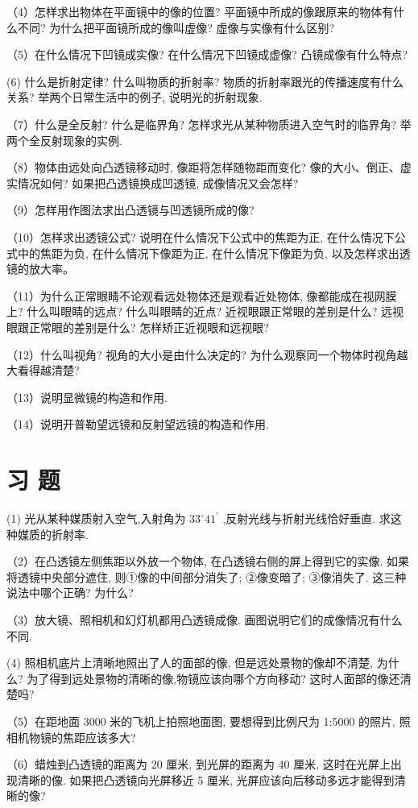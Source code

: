\documentclass[10pt]{article}
\begin{document}
（4）怎样求出物体在平面镜中的像的位置? 平面镜中所成的像跟原来的物体有什么不同? 为什么把平面镜所成的像叫虚像? 虚像与实像有什么区别?

（5）在什么情况下凹镜成实像? 在什么情况下凹镜成虚像? 凸镜成像有什么特点?

(6) 什么是折射定律? 什么叫物质的折射率? 物质的折射率跟光的传播速度有什么关系? 举两个日常生活中的例子, 说明光的折射现象.

（7）什么是全反射? 什么是临界角? 怎样求光从某种物质进入空气时的临界角? 举两个全反射现象的实例.

（8）物体由远处向凸透镜移动时, 像距将怎样随物距而变化? 像的大小、倒正、虚实情况如何? 如果把凸透镜换成凹透镜, 成像情况又会怎样?

（9）怎样用作图法求出凸透镜与凹透镜所成的像?

（10）怎样求出透镜公式? 说明在什么情况下公式中的焦距为正, 在什么情况下公式中的焦距为负, 在什么情况下像距为正, 在什么情况下像距为负, 以及怎样求出透镜的放大率。

（11）为什么正常眼睛不论观看远处物体还是观看近处物体, 像都能成在视网膜上? 什么叫眼睛的远点? 什么叫眼睛的近点? 近视眼跟正常眼的差别是什么? 远视眼跟正常眼的差别是什么? 怎样矫正近视眼和远视眼?

（12）什么叫视角? 视角的大小是由什么决定的? 为什么观察同一个物体时视角越大看得越清楚?

（13）说明显微镜的构造和作用.

（14）说明开普勒望远镜和反射望远镜的构造和作用.

\section*{习 题}

(1) 光从某种媒质射入空气,入射角为 \({33}^{ \circ }{41}^{\prime }\) ,反射光线与折射光线恰好垂直. 求这种媒质的折射率.

（2）在凸透镜左侧焦距以外放一个物体, 在凸透镜右侧的屏上得到它的实像. 如果将透镜中央部分遮住, 则①像的中间部分消失了; ②像变暗了; ③像消失了. 这三种说法中哪个正确? 为什么?

（3）放大镜、照相机和幻灯机都用凸透镜成像. 画图说明它们的成像情况有什么不同.

(4) 照相机底片上清晰地照出了人的面部的像, 但是远处景物的像却不清楚, 为什么? 为了得到远处景物的清晰的像,物镜应该向哪个方向移动? 这时人面部的像还清楚吗?

（5）在距地面 3000 米的飞机上拍照地面图, 要想得到比例尺为 1:5000 的照片, 照相机物镜的焦距应该多大?

（6）蜡烛到凸透镜的距离为 20 厘米, 到光屏的距离为 40 厘米, 这时在光屏上出现清晰的像. 如果把凸透镜向光屏移近 5 厘米, 光屏应该向后移动多远才能得到清晰的像?
\end{document}
